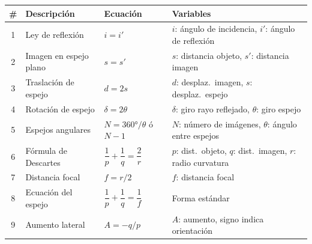 \documentclass[12pt, a4paper]{article}
\theoremstyle{definition}
\begin{document}
\begin{center}
\begin{tabular}{@{}clll@{}}
\toprule
\textbf{\#} & \textbf{Descripción} & \textbf{Ecuación} & \textbf{Variables} \\
\midrule
1 & Ley de reflexión & \(i = i'\) & \(i\): ángulo de incidencia, \(i'\): ángulo de reflexión \\
2 & Imagen en espejo plano & \(s = s'\) & \(s\): distancia objeto, \(s'\): distancia imagen \\
3 & Traslación de espejo & \(d = 2s\) & \(d\): desplaz.\ imagen, \(s\): desplaz.\ espejo \\
4 & Rotación de espejo & \(\delta = 2\theta\) & \(\delta\): giro rayo reflejado, \(\theta\): giro espejo \\
5 & Espejos angulares & \(N = 360°/\theta\) ó \(N-1\) & \(N\): número de imágenes, \(\theta\): ángulo entre espejos \\
6 & Fórmula de Descartes & \(\dfrac{1}{p}+\dfrac{1}{q}=\dfrac{2}{r}\) & \(p\): dist.\ objeto, \(q\): dist.\ imagen, \(r\): radio curvatura \\
7 & Distancia focal & \(f = r/2\) & \(f\): distancia focal \\
8 & Ecuación del espejo & \(\dfrac{1}{p}+\dfrac{1}{q}=\dfrac{1}{f}\) & Forma estándar \\
9 & Aumento lateral & \(A = -q/p\) & \(A\): aumento, signo indica orientación \\
\bottomrule
\end{tabular}
\end{center}
\end{document}
